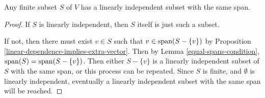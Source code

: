 \begin{prop}\label{linearly-independent-subset-existence}
    Any finite subset $S$ of $V$ has a linearly independent subset with the same span.
\end{prop}

\begin{proof}
    If $S$ is linearly independent, then $S$ itself is just such a subset.

    If not, then there must exist $v \in S$ such that $v \in \operatorname{span}(S - \{v\})$ by Proposition \ref{linear-dependence-implies-extra-vector}. Then by Lemma \ref{equal-spans-condition}, $\operatorname{span}(S) = \operatorname{span}(S - \{v\})$. Then either $S - \{v\}$ is a linearly independent subset of $S$ with the same span, or this process can be repeated. Since $S$ is finite, and $\emptyset$ is linearly independent, eventually a linearly independent subset with the same span will be reached.
\end{proof}

